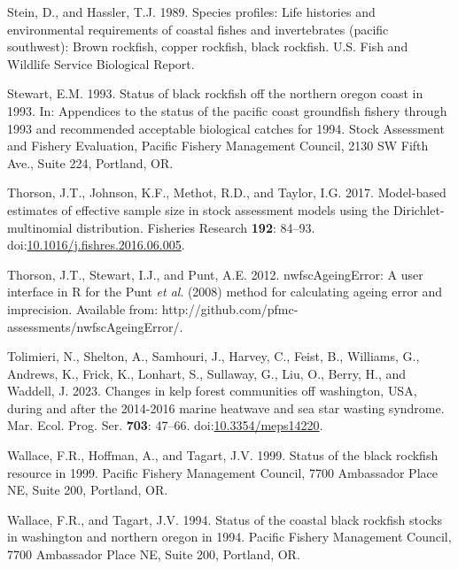 \documentclass[11pt,
  english,
  letterpaper,
]{article}
\newlength{\cslhangindent}
\newenvironment{CSLReferences}[2] %
 {%
  \setlength{\parindent}{0pt}
  \ifodd #1 \everypar{\setlength{\hangindent}{\cslhangindent}}\ignorespaces\fi
  \ifnum #2 > 0
  \setlength{\parskip}{#2\baselineskip}
  \fi
 }%
 {}
\begin{document}
\begin{CSLReferences}{1}{0}
\leavevmode{}%
Stein, D., and Hassler, T.J. 1989. Species profiles: Life histories and environmental requirements of coastal fishes and invertebrates (pacific southwest): Brown rockfish, copper rockfish, black rockfish. U.S. Fish and Wildlife Service Biological Report.

\leavevmode{}%
Stewart, E.M. 1993. Status of black rockfish off the northern oregon coast in 1993. In: Appendices to the status of the pacific coast groundfish fishery through 1993 and recommended acceptable biological catches for 1994. Stock Assessment and Fishery Evaluation, Pacific Fishery Management Council, 2130 SW Fifth Ave., Suite 224, Portland, OR.

\leavevmode{}%
Thorson, J.T., Johnson, K.F., Methot, R.D., and Taylor, I.G. 2017. Model-based estimates of effective sample size in stock assessment models using the {Dirichlet}-multinomial distribution. Fisheries Research \textbf{192}: 84--93. doi:\href{https://doi.org/10.1016/j.fishres.2016.06.005}{10.1016/j.fishres.2016.06.005}.

\leavevmode{}%
Thorson, J.T., Stewart, I.J., and Punt, A.E. 2012. {nwfscAgeingError}: A user interface in {R} for the {P}unt \emph{et al}. (2008) method for calculating ageing error and imprecision. Available from: http://github.com/pfmc-assessments/nwfscAgeingError/.

\leavevmode{}%
Tolimieri, N., Shelton, A., Samhouri, J., Harvey, C., Feist, B., Williams, G., Andrews, K., Frick, K., Lonhart, S., Sullaway, G., Liu, O., Berry, H., and Waddell, J. 2023. Changes in kelp forest communities off washington, {USA}, during and after the 2014-2016 marine heatwave and sea star wasting syndrome. Mar. Ecol. Prog. Ser. \textbf{703}: 47--66. doi:\href{https://doi.org/10.3354/meps14220}{10.3354/meps14220}.

\leavevmode{}%
Wallace, F.R., Hoffman, A., and Tagart, J.V. 1999. Status of the black rockfish resource in 1999. Pacific Fishery Management Council, 7700 Ambassador Place NE, Suite 200, Portland, OR.

\leavevmode{}%
Wallace, F.R., and Tagart, J.V. 1994. Status of the coastal black rockfish stocks in washington and northern oregon in 1994. Pacific Fishery Management Council, 7700 Ambassador Place NE, Suite 200, Portland, OR.


\end{CSLReferences}
\end{document}
